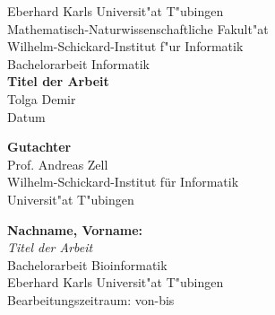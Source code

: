 \documentclass[twoside,12pt,a4paper]{report}
\begin{document}
	
	
	\begin{titlepage}
		\begin{center}
			{\LARGE Eberhard Karls Universit"at T"ubingen}\\
			{\large Mathematisch-Naturwissenschaftliche Fakult"at \\
				Wilhelm-Schickard-Institut f"ur Informatik\\[4cm]}
			{\huge Bachelorarbeit Informatik\\[2cm]}
			{\Large\bf  Titel der Arbeit\\[1.5cm]}
			{\large Tolga Demir}\\[0.5cm]
			Datum\\[3cm]
			\begin{center}{\small\bf Gutachter}\\[0.5cm]
				{\large Prof. Andreas Zell}\\
				{\footnotesize Wilhelm-Schickard-Institut f\"ur Informatik\\
					Universit"at T"ubingen}	\end{center}
			
			
			
		\end{center}
	\end{titlepage}
	
	
	\thispagestyle{empty}
	\vspace*{\fill}
	\begin{minipage}{11.2cm}
		\textbf{Nachname, Vorname:}\\
		\emph{Titel der Arbeit}\\ Bachelorarbeit Bioinformatik\\
		Eberhard Karls Universit"at T"ubingen\\
		Bearbeitungszeitraum: von-bis
	\end{minipage}
	\newpage
	
	\thispagestyle{empty}
	
\end{document}
